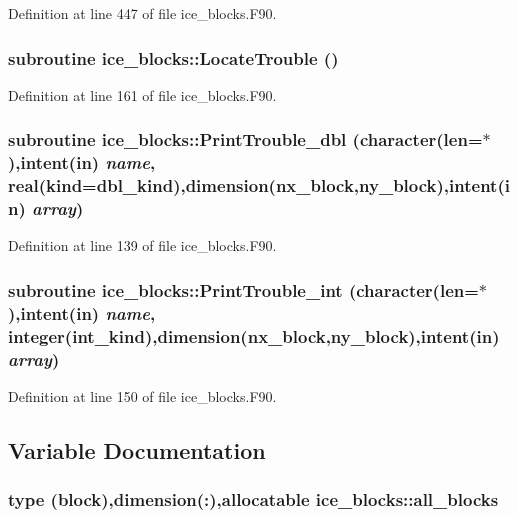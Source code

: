 Definition at line 447 of file ice\_\-blocks.F90.\hypertarget{namespaceice__blocks_a5ce0e098c40801be2e5f8f25d6f6af07}{
\subsubsection[{LocateTrouble}]{\setlength{\rightskip}{0pt plus 5cm}subroutine ice\_\-blocks::LocateTrouble ()}}
\label{namespaceice__blocks_a5ce0e098c40801be2e5f8f25d6f6af07}


Definition at line 161 of file ice\_\-blocks.F90.\hypertarget{namespaceice__blocks_a844c65de0acaeb5796d6ce421b70c5c2}{
\subsubsection[{PrintTrouble\_\-dbl}]{\setlength{\rightskip}{0pt plus 5cm}subroutine ice\_\-blocks::PrintTrouble\_\-dbl (character(len=$\ast$),intent(in) {\em name}, \/  real(kind=dbl\_\-kind),dimension(nx\_\-block,ny\_\-block),intent(in) {\em array})}}
\label{namespaceice__blocks_a844c65de0acaeb5796d6ce421b70c5c2}


Definition at line 139 of file ice\_\-blocks.F90.\hypertarget{namespaceice__blocks_a4a82607c32a256c67866525e0856b864}{
\subsubsection[{PrintTrouble\_\-int}]{\setlength{\rightskip}{0pt plus 5cm}subroutine ice\_\-blocks::PrintTrouble\_\-int (character(len=$\ast$),intent(in) {\em name}, \/  integer(int\_\-kind),dimension(nx\_\-block,ny\_\-block),intent(in) {\em array})}}
\label{namespaceice__blocks_a4a82607c32a256c67866525e0856b864}


Definition at line 150 of file ice\_\-blocks.F90.

\subsection{Variable Documentation}
\hypertarget{namespaceice__blocks_a29dbac203a4f7066fd7d3774c79cb455}{
\subsubsection[{all\_\-blocks}]{\setlength{\rightskip}{0pt plus 5cm}type ({\bf block}),dimension(:),allocatable {\bf ice\_\-blocks::all\_\-blocks}}}
\label{namespaceice__blocks_a29dbac203a4f7066fd7d3774c79cb455}


